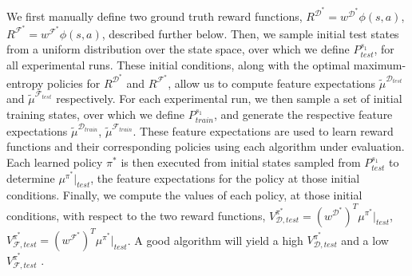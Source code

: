 \documentclass[a4paper,11pt]{report}
\begin{document}
We first manually define two ground truth reward functions, $R^{\mathcal{D}^*} = w^{\mathcal{D}^*}\phi(s,a)$, $R^{\mathcal{F}^*} = w^{\mathcal{F}^*}\phi(s,a)$, described further below. Then, we sample initial test states from a uniform distribution over the state space, over which we define $P^{s_1}_{test}$, for all experimental runs. These initial conditions, along with the optimal maximum-entropy policies for $R^{\mathcal{D}^*}$ and $R^{\mathcal{F}^*}$, allow us to compute feature expectations $\widetilde{\mu}^{\mathcal{D}_{test}}$ and $\widetilde{\mu}^{\mathcal{F}_{test}}$ respectively. For each experimental run, we then sample a set of initial training states, over which we define $P^{s_{1}}_{train}$, %
and generate the respective feature expectations $\widetilde{\mu}^{\mathcal{D}_{train}}$, $\widetilde{\mu}^{\mathcal{F}_{train}}$. These feature expectations are used to learn reward functions and their corresponding  policies using each algorithm under evaluation. Each learned policy $\pi^*$ is then executed from initial states sampled from $P^{s_{1}}_{test}$ to determine $\mu^{\pi^*}|_{test}$, the feature expectations for the policy at those initial conditions. Finally, we compute the values of each policy, at those initial conditions, with respect to the two reward functions, $V^{\pi^*}_{\mathcal{D},test} = (w^{\mathcal{D}^*})^T\mu^{\pi^*}|_{test}$, $V^{\pi^*}_{\mathcal{F},test} = (w^{\mathcal{F}^*})^T\mu^{\pi^*}|_{test}$. A good algorithm will yield a high $V^{\pi^*}_{\mathcal{D},test}$ and a low $V^{\pi^*}_{\mathcal{F},test}$ .
\end{document}
